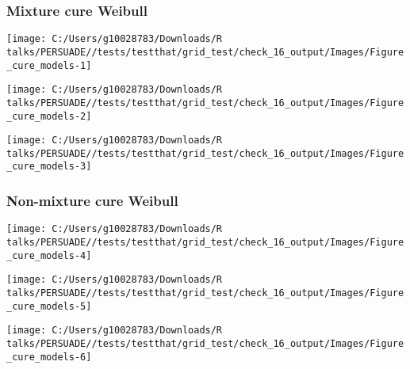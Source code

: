 \documentclass[
]{article}
\begin{document}
\clearpage

\clearpage

\subsubsection{Mixture cure Weibull}\label{mixture-cure-weibull}

\begin{flushleft}\texttt{[image: C:/Users/g10028783/Downloads/R talks/PERSUADE//tests/testthat/grid\_test/check\_16\_output/Images/Figure\_cure\_models-1]} \end{flushleft}

\begin{flushleft}\texttt{[image: C:/Users/g10028783/Downloads/R talks/PERSUADE//tests/testthat/grid\_test/check\_16\_output/Images/Figure\_cure\_models-2]} \end{flushleft}

\begin{flushleft}\texttt{[image: C:/Users/g10028783/Downloads/R talks/PERSUADE//tests/testthat/grid\_test/check\_16\_output/Images/Figure\_cure\_models-3]} \end{flushleft}

\clearpage

\subsubsection{Non-mixture cure Weibull}\label{non-mixture-cure-weibull}

\begin{flushleft}\texttt{[image: C:/Users/g10028783/Downloads/R talks/PERSUADE//tests/testthat/grid\_test/check\_16\_output/Images/Figure\_cure\_models-4]} \end{flushleft}

\begin{flushleft}\texttt{[image: C:/Users/g10028783/Downloads/R talks/PERSUADE//tests/testthat/grid\_test/check\_16\_output/Images/Figure\_cure\_models-5]} \end{flushleft}

\begin{flushleft}\texttt{[image: C:/Users/g10028783/Downloads/R talks/PERSUADE//tests/testthat/grid\_test/check\_16\_output/Images/Figure\_cure\_models-6]} \end{flushleft}

\clearpage
\end{document}
